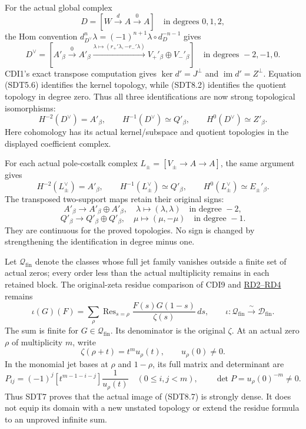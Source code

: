 For the actual global complex \[
D=[W\xrightarrow d A\xrightarrow0 A]
\quad\text{in degrees }0,1,2,
\] the Hom convention
\(d_{D^\vee}^n\lambda=(-1)^{n+1}\lambda\circ d_D^{-n-1}\) gives \[
D^\vee=[A'_\beta\xrightarrow0 A'_\beta
\xrightarrow{\lambda\mapsto(r_+'\lambda,-r_-'\lambda)}
V_+'{}_\beta\oplus V_-'{}_\beta]
\quad\text{in degrees }-2,-1,0.
\tag{SDT8.3}
\] CDI1's exact transpose computation gives \(\ker d'=J^\perp\) and
\(\operatorname{im}d'=Z^\perp\). Equation (SDT5.6) identifies the kernel
topology, while (SDT8.2) identifies the quotient topology in degree
zero. Thus all three identifications are now strong topological
isomorphisms: \[
\boxed{
H^{-2}(D^\vee)=A'_\beta,\qquad
H^{-1}(D^\vee)\simeq Q'_\beta,\qquad
H^0(D^\vee)\simeq Z'_\beta.}
\tag{SDT8.4}
\] Here cohomology has its actual kernel/subspace and quotient
topologies in the displayed coefficient complex.

For each actual pole-costalk complex \(L_\pm=[V_\pm\to A\to A]\), the
same argument gives \[
\boxed{
H^{-2}(L_\pm^\vee)=A'_\beta,\qquad
H^{-1}(L_\pm^\vee)\simeq Q'_\beta,\qquad
H^0(L_\pm^\vee)\simeq E_\pm'{}_\beta.}
\tag{SDT8.5}
\] The transposed two-support maps retain their original signs: \[
A'_\beta\longrightarrow A'_\beta\oplus A'_\beta,\quad
\lambda\longmapsto(\lambda,\lambda)
\quad\text{in degree }-2,
\] \[
Q'_\beta\longrightarrow Q'_\beta\oplus Q'_\beta,\quad
\mu\longmapsto(\mu,-\mu)
\quad\text{in degree }-1.
\tag{SDT8.6}
\] They are continuous for the proved topologies. No sign is changed by
strengthening the identification in degree minus one.

Let \(\mathcal Q_{\mathrm{fin}}\) denote the classes whose full jet
family vanishes outside a finite set of actual zeros; every order less
than the actual multiplicity remains in each retained block. The
original-zeta residue comparison of CDI9 and
\href{https://github.com/KokunoYumeto/zeta-function-research-reader/blob/main/workbenches/splitzero-tandem/continuations/20260924-cohomology-weight-and-character-lifts/geometric-positive-quotient/ORIGINAL_ZETA_RESIDUE_DUAL_AND_SUPPORT_MAPS.md}{RD2--RD4}
remains \[
\iota(G)(F)=\sum_\rho\operatorname{Res}_{s=\rho}
\frac{F(s)G(1-s)}{\zeta(s)}\,ds,
\qquad
\iota:\mathcal Q_{\mathrm{fin}}\xrightarrow{\ \sim\ }
\mathscr D_{\mathrm{fin}}.
\tag{SDT8.7}
\] The sum is finite for \(G\in\mathcal Q_{\mathrm{fin}}\). Its
denominator is the original \(\zeta\). At an actual zero \(\rho\) of
multiplicity \(m\), write \[
\zeta(\rho+t)=t^m u_\rho(t),\qquad u_\rho(0)\ne0.
\] In the monomial jet bases at \(\rho\) and \(1-\rho\), its full matrix
and determinant are \[
P_{ij}=(-1)^j[t^{m-1-i-j}]\frac1{u_\rho(t)}
\quad(0\le i,j<m),\qquad
\det P=u_\rho(0)^{-m}\ne0.
\tag{SDT8.8}
\] Thus SDT7 proves that the actual image of (SDT8.7) is strongly dense.
It does not equip its domain with a new unstated topology or extend the
residue formula to an unproved infinite sum.

